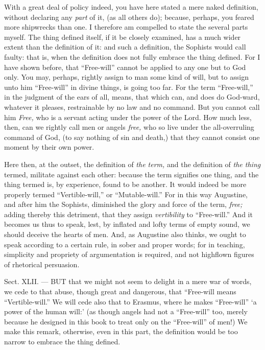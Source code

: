 With a great deal of policy indeed, you have here stated a mere naked definition, without declaring any \emph{part }of it, (as all others do); because, perhaps, you feared more shipwrecks than one. I therefore am compelled to state the several parts myself. The thing defined itself, if it be closely examined, has a much wider extent than the definition of it: and such a definition, the Sophists would call faulty: that is, when the definition does not fully embrace the thing defined. For I have shown before, that “Free-will” cannot be applied to any one but to God only. You may, perhaps, rightly assign to man some kind of will, but to assign unto him “Free-will” in divine things, is going too far. For the term “Free-will,” in the judgment of the ears of all, means, that which can, and does do God-ward, whatever it pleases, restrainable by no law and no command. But you cannot call him \emph{Free, }who is a servant acting under the power of the Lord. How much less, then, can we rightly call men or angels \emph{free, }who so live under the all-overruling command of God, (to say nothing of sin and death,) that they cannot consist one moment by their own power.

Here then, at the outset, the definition of \emph{the term, }and the definition of \emph{the thing }termed, militate against each other: because the term signifies one thing, and the thing termed is, by experience, found to be another. It would indeed be more properly termed “Vertible-will,” or “Mutable-will.” For in this way Augustine, and after him the Sophists, diminished the glory and force of the term, \emph{free; }adding thereby this detriment, that they assign \emph{vertibility }to “Free-will.” And it becomes us thus to speak, lest, by inflated and lofty terms of empty sound, we should deceive the hearts of men. And, as Augustine also thinks, we ought to speak according to a certain rule, in sober and proper words; for in teaching, simplicity and propriety of argumentation is required, and not highflown figures of rhetorical persuasion.


Sect. XLII. — BUT that we might not seem to delight in a mere war of words, we cede to that abuse, though great and dangerous, that “Free-will means “Vertible-will.” We will cede also that to Erasmus, where he makes “Free-will” ‘a power of the human will:’ (as though angels had not a “Free-will” too, merely because he designed in this book to treat only on the “Free-will” of men!) We make this remark, otherwise, even in this part, the definition would be too narrow to embrace the thing defined.

